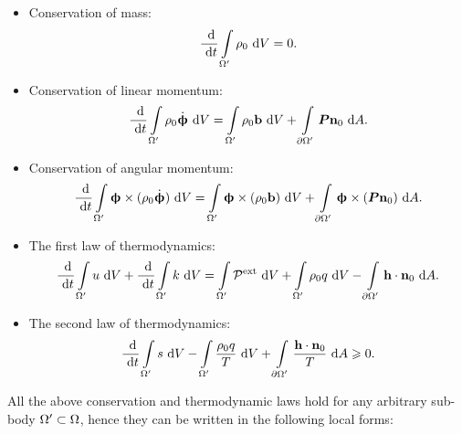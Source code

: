\begin{itemize}
  \item Conservation of mass:
        \begin{align}
          \dfrac{\text{ d}}{\text{ d}t} \int\limits_{\Omega'} \rho_0 \text{ d}V = 0.
        \end{align}
  \item Conservation of linear momentum:
        \begin{align}
          \dfrac{\text{ d}}{\text{ d}t} \int\limits_{\Omega'} \rho_0 \dot{\boldsymbol{\upphi}} \text{ d}V = \int\limits_{\Omega'} \rho_0 \textbf{b} \text{ d}V + \int\limits_{{\partial \Omega}'} \boldsymbol{P}\textbf{n}_0 \text{ d}A.
        \end{align}
  \item Conservation of angular momentum:
        \begin{align}
          \dfrac{\text{ d}}{\text{ d}t} \int\limits_{\Omega'} \boldsymbol{\upphi} \times (\rho_0 \dot{\boldsymbol{\upphi}}) \text{ d}V = \int\limits_{\Omega'} \boldsymbol{\upphi} \times (\rho_0 \textbf{b}) \text{ d}V + \int\limits_{{\partial \Omega}'} \boldsymbol{\upphi} \times (\boldsymbol{P}\textbf{n}_0) \text{ d}A.
        \end{align}
  \item The first law of thermodynamics:
        \begin{equation}
          \begin{aligned}
            \dfrac{\text{ d}}{\text{ d}t} \int\limits_{\Omega'} u \text{ d}V + \dfrac{\text{ d}}{\text{ d}t} \int\limits_{\Omega'} k \text{ d}V = \int\limits_{\Omega'} \mathcal{P}^\text{ext} \text{ d}V + \int\limits_{\Omega'} \rho_0 q \text{ d}V - \int\limits_{{\partial \Omega}'} \textbf{h} \cdot \textbf{n}_0 \text{ d}A.
          \end{aligned}
        \end{equation}
  \item The second law of thermodynamics:
        \begin{align}
          \dfrac{\text{ d}}{\text{ d}t} \int\limits_{\Omega'} s \text{ d}V - \int\limits_{\Omega'} \dfrac{\rho_0 q}{T} \text{ d}V + \int\limits_{{\partial \Omega}'} \dfrac{\textbf{h} \cdot \textbf{n}_0}{T} \text{ d}A \geqslant 0.
        \end{align}
\end{itemize}
All the above conservation and thermodynamic laws hold for any arbitrary sub-body $\Omega' \subset \Omega$, hence they can be written in the following local forms:
